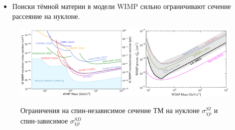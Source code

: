 \begin{itemize}
	\item Поиски тёмной материи в модели WIMP сильно ограничивают сечение рассеяние на нуклоне.
\end{itemize}

\begin{figure}
	\includegraphics[width=0.53\textwidth]{images/pdg_si_limits.pdf}
	\includegraphics[width=0.45\textwidth]{images/DirectSD.png}
	\caption{Ограничения на спин-независимое сечение ТМ на нуклоне $\sigma^{SI}_{\chi p}$ и спин-зависимое $\sigma^{SD}_{\chi p}$}
\end{figure}
